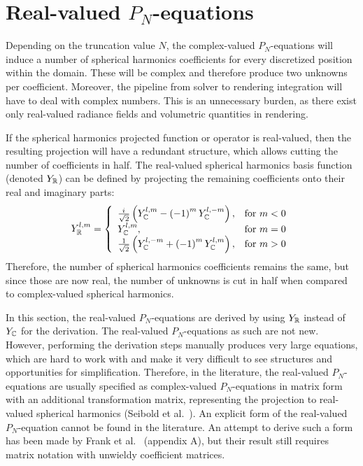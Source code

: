 \section{Real-valued $P_N$-equations}
\label{sec:pn_rvalued}

Depending on the truncation value $N$, the complex-valued $P_N$-equations will induce a number of spherical harmonics coefficients for every discretized position within the domain. These will be complex and therefore produce two unknowns per coefficient. Moreover, the pipeline from solver to rendering integration will have to deal with complex numbers. This is an unnecessary burden, as there exist only real-valued radiance fields and volumetric quantities in rendering.

If the spherical harmonics projected function or operator is real-valued, then the resulting projection will have a redundant structure, which allows cutting the number of coefficients in half. The real-valued spherical harmonics basis function (denoted $Y_{\mathbb{R}}$) can be defined by projecting the remaining coefficients onto their real and imaginary parts:
\begin{align}
\label{eq:real_sh_basis}
Y_{\mathbb{R}}^{l,m}=
\left\{
\begin{array}{lr}
\frac{{i\mkern1mu}}{\sqrt{2}}\left(Y_{\mathbb{C}}^{l,m}-\left(-1\right)^mY_{\mathbb{C}}^{l,-m}\right), & \text{for } m < 0\\
Y_{\mathbb{C}}^{l,m}, & \text{for } m = 0\\
\frac{1}{\sqrt{2}}\left(Y_{\mathbb{C}}^{l,-m}+\left(-1\right)^mY_{\mathbb{C}}^{l,m}\right), & \text{for } m > 0
\end{array}
\right.
\end{align}
Therefore, the number of spherical harmonics coefficients remains the same, but since those are now real, the number of unknowns is cut in half when compared to complex-valued spherical harmonics.

In this section, the real-valued $P_N$-equations are derived by using $Y_{\mathbb{R}}$ instead of $Y_{\mathbb{C}}$ for the derivation. The real-valued $P_N$-equations as such are not new. However, performing the derivation steps manually produces very large equations, which are hard to work with and make it very difficult to see structures and opportunities for simplification. Therefore, in the literature, the real-valued $P_N$-equations are usually specified as complex-valued $P_N$-equations in matrix form with an additional transformation matrix, representing the projection to real-valued spherical harmonics (Seibold et al.~\cite{Seibold14}). An explicit form of the real-valued $P_N$-equation cannot be found in the literature. An attempt to derive such a form has been made by Frank et al.~\cite{Frank14} (appendix A), but their result still requires matrix notation with unwieldy coefficient matrices. 

